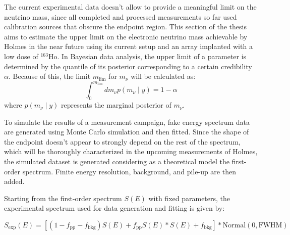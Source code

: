 The current experimental data doesn't allow to provide a meaningful limit on the neutrino mass, since all completed and
processed measurements so far used calibration sources that obscure the endpoint region. This section of the thesis
aims to estimate the upper limit on the electronic neutrino mass achievable by Holmes in the near future using its current setup and an array implanted with a low dose of $^{163}$Ho. 
In Bayesian data analysis, the upper limit of a parameter is determined by the quantile of its posterior corresponding
to a certain credibility $\alpha$. Because of this, the limit $m_{\text{lim}}$ for $m_\nu$ will be calculated as:
\begin{equation}
\int_0^{m_{\text{lim}}} dm_\nu p(m_\nu\mid y) = 1-\alpha
\end{equation}
where $p(m_\nu\mid y)$ represents the marginal posterior of $m_\nu$.

To simulate the results of a measurement campaign, fake energy spectrum data are generated using Monte Carlo simulation
and then fitted. Since the shape of the endpoint doesn't appear to strongly depend on the rest of the spectrum, which
will be thoroughly characterized in the upcoming measurements of Holmes, the simulated dataset is generated
considering as a theoretical model the first-order spectrum. Finite energy resolution, background, and pile-up are then added.


Starting from the first-order spectrum $S(E)$ with fixed parameters, the experimental spectrum used for data generation
and fitting is given by:

\begin{equation}
S_{\text{exp}}(E) = [(1-f_{\text{pp}}-f_{\text{bkg}})S(E) + f_{\text{pp}} S(E) * S(E)+ f_{\text{bkg}}] * \text{Normal}(0, \text{FWHM})
\end{equation}

